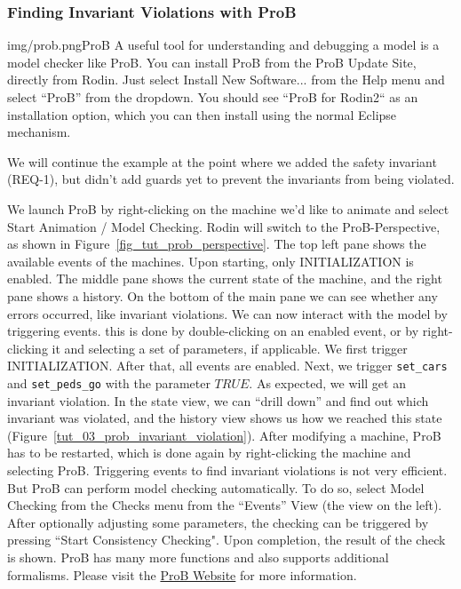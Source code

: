 \subsubsection{Finding Invariant Violations with ProB}
\label{tut:prob}
\begin{rodin-plugin}{img/prob.png}{ProB}
A useful tool for understanding and debugging a model is a model checker like ProB. You can install ProB from the ProB Update Site, directly from Rodin.  Just select \textsf{Install New Software...} from the \textsf{Help} menu and select ``ProB'' from the dropdown. You should see ``ProB for Rodin2`` as an installation option, which you can then install using the normal Eclipse mechanism.

We will continue the example at the point where we added the safety invariant (REQ-1), but didn't add guards yet to prevent the invariants from being violated.

We launch ProB by right-clicking on the machine we'd like to animate and select \textsf{Start Animation / Model Checking}.  Rodin will switch to the ProB-Perspective, as shown in Figure~\ref{fig_tut_prob_perspective}. The top left pane shows the available events of the machines.  Upon starting, only INITIALIZATION is enabled.  The middle pane shows the current state of the machine, and the right pane shows a history.  On the bottom of the main pane we can see whether any errors occurred, like invariant violations. We can now interact with the model by triggering events.  this is done by double-clicking on an enabled event, or by right-clicking it and selecting a set of parameters, if applicable.  We first trigger INITIALIZATION.  After that, all events are enabled.  Next, we trigger \texttt{set\_cars} and \texttt{set\_peds\_go}  with the parameter $TRUE$.  As expected, we will get an invariant violation.  In the state view, we can ``drill down'' and find out which invariant was violated, and the history view shows us how we reached this state (Figure~\ref{tut_03_prob_invariant_violation}). After modifying a machine, ProB has to be restarted, which is done again by right-clicking the machine and selecting ProB.  Triggering events to find invariant violations is not very efficient.  But ProB can perform model checking automatically.  To do so, select \textsf{Model Checking} from the \textsf{Checks} menu from the ``Events'' View (the view on the left).  After optionally adjusting some parameters, the checking can be triggered by pressing ``Start Consistency Checking".  Upon completion, the result of the check is shown. ProB has many more functions and also supports additional formalisms. Please visit the \href{http://www.stups.uni-duesseldorf.de/ProB}{ProB Website} for more information.

\end{rodin-plugin}


